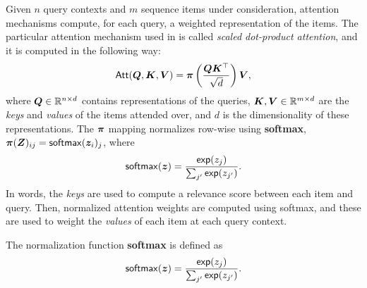 Given $n$ query contexts and $m$ sequence items under consideration,
attention mechanisms compute, for each query, a weighted
representation of the items. The particular attention mechanism used
in \citet{vaswani2017attention} is called \emph{scaled dot-product
    attention}, and it is computed in the following way:
%
\begin{equation}
    \operatorname{\mathsf{Att}}(\bm{Q}, \bm{K}, \bm{V}) = \bm{\pi}
    \left(\frac{\bm{Q}\bm{K}^\top}{\sqrt{d}}\right) \bm{V},
    \label{eq:att_scaled_dot}
\end{equation}
%
where $\bm{Q} \in \mathbb{R}^{n \times d}$ contains representations of the
queries, $\bm{K}, \bm{V} \in \mathbb{R}^{m \times d}$
are the \emph{keys} and \emph{values} of the items attended over,
and $d$ is the dimensionality of these
representations.
The $\bm{\pi}$ mapping normalizes row-wise using \textbf{softmax},
$\bm{\pi}(\bm{Z})_{ij} = \operatorname*{\mathsf{softmax}}(\bm{z}_i)_j$, where
%
\begin{equation}
    \operatorname*{\mathsf{softmax}}(\bm{z}) = \frac{\operatorname*{\mathsf{exp}}(z_j)}{\sum_{j'} \operatorname*{\mathsf{exp}}(z_{j'})}.
\end{equation}
%
In words, the \emph{keys} are used to compute a relevance score
between each item and query. Then, normalized attention weights are computed
using softmax, and these are used to weight the \emph{values} of each item at each
query context.

\begin{definition}
    The normalization function \textbf{softmax} is defined as
    \begin{equation}\label{eq:softmax}
        \operatorname*{\mathsf{softmax}}(\bm{z}) = \frac{\operatorname*{\mathsf{exp}}(z_j)}{\sum_{j'} \operatorname*{\mathsf{exp}}(z_{j'})}.
    \end{equation}
\end{definition}

